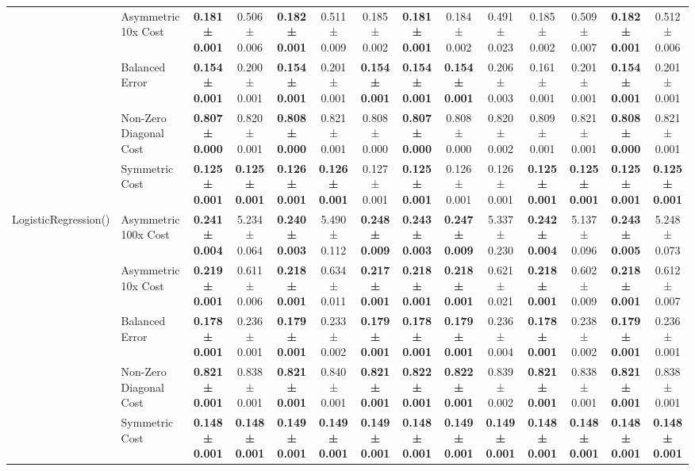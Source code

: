 \begin{table}[H]
{\begin{tabular}{llcccccccccccc}
 & Asymmetric 10x Cost & \textbf{0.181 ± 0.001} & 0.506 ± 0.006 & \textbf{0.182 ± 0.001} & 0.511 ± 0.009 & 0.185 ± 0.002 & \textbf{0.181 ± 0.001} & 0.184 ± 0.002 & 0.491 ± 0.023 & 0.185 ± 0.002 & 0.509 ± 0.007 & \textbf{0.182 ± 0.001} & 0.512 ± 0.006 \\
 & Balanced Error & \textbf{0.154 ± 0.001} & 0.200 ± 0.001 & \textbf{0.154 ± 0.001} & 0.201 ± 0.001 & \textbf{0.154 ± 0.001} & \textbf{0.154 ± 0.001} & \textbf{0.154 ± 0.001} & 0.206 ± 0.003 & 0.161 ± 0.001 & 0.201 ± 0.001 & \textbf{0.154 ± 0.001} & 0.201 ± 0.001 \\
 & Non-Zero Diagonal Cost & \textbf{0.807 ± 0.000} & 0.820 ± 0.001 & \textbf{0.808 ± 0.000} & 0.821 ± 0.001 & 0.808 ± 0.000 & \textbf{0.807 ± 0.000} & 0.808 ± 0.000 & 0.820 ± 0.002 & 0.809 ± 0.001 & 0.821 ± 0.001 & \textbf{0.808 ± 0.000} & 0.821 ± 0.001 \\
 & Symmetric Cost & \textbf{0.125 ± 0.001} & \textbf{0.125 ± 0.001} & \textbf{0.126 ± 0.001} & \textbf{0.126 ± 0.001} & 0.127 ± 0.001 & \textbf{0.125 ± 0.001} & 0.126 ± 0.001 & 0.126 ± 0.001 & \textbf{0.125 ± 0.001} & \textbf{0.125 ± 0.001} & \textbf{0.125 ± 0.001} & \textbf{0.125 ± 0.001} \\
\cline{1-14}
\multirow[t]{5}{*}{LogisticRegression()} & Asymmetric 100x Cost & \textbf{0.241 ± 0.004} & 5.234 ± 0.064 & \textbf{0.240 ± 0.003} & 5.490 ± 0.112 & \textbf{0.248 ± 0.009} & \textbf{0.243 ± 0.003} & \textbf{0.247 ± 0.009} & 5.337 ± 0.230 & \textbf{0.242 ± 0.004} & 5.137 ± 0.096 & \textbf{0.243 ± 0.005} & 5.248 ± 0.073 \\
 & Asymmetric 10x Cost & \textbf{0.219 ± 0.001} & 0.611 ± 0.006 & \textbf{0.218 ± 0.001} & 0.634 ± 0.011 & \textbf{0.217 ± 0.001} & \textbf{0.218 ± 0.001} & \textbf{0.218 ± 0.001} & 0.621 ± 0.021 & \textbf{0.218 ± 0.001} & 0.602 ± 0.009 & \textbf{0.218 ± 0.001} & 0.612 ± 0.007 \\
 & Balanced Error & \textbf{0.178 ± 0.001} & 0.236 ± 0.001 & \textbf{0.179 ± 0.001} & 0.233 ± 0.002 & \textbf{0.179 ± 0.001} & \textbf{0.178 ± 0.001} & \textbf{0.179 ± 0.001} & 0.236 ± 0.004 & \textbf{0.178 ± 0.001} & 0.238 ± 0.002 & \textbf{0.179 ± 0.001} & 0.236 ± 0.001 \\
 & Non-Zero Diagonal Cost & \textbf{0.821 ± 0.001} & 0.838 ± 0.001 & \textbf{0.821 ± 0.001} & 0.840 ± 0.001 & \textbf{0.821 ± 0.001} & \textbf{0.822 ± 0.001} & \textbf{0.822 ± 0.001} & 0.839 ± 0.002 & \textbf{0.821 ± 0.001} & 0.838 ± 0.001 & \textbf{0.821 ± 0.001} & 0.838 ± 0.001 \\
 & Symmetric Cost & \textbf{0.148 ± 0.001} & \textbf{0.148 ± 0.001} & \textbf{0.149 ± 0.001} & \textbf{0.149 ± 0.001} & \textbf{0.149 ± 0.001} & \textbf{0.148 ± 0.001} & \textbf{0.149 ± 0.001} & \textbf{0.149 ± 0.001} & \textbf{0.148 ± 0.001} & \textbf{0.148 ± 0.001} & \textbf{0.148 ± 0.001} & \textbf{0.148 ± 0.001} \\

\end{tabular}}
\end{table}
